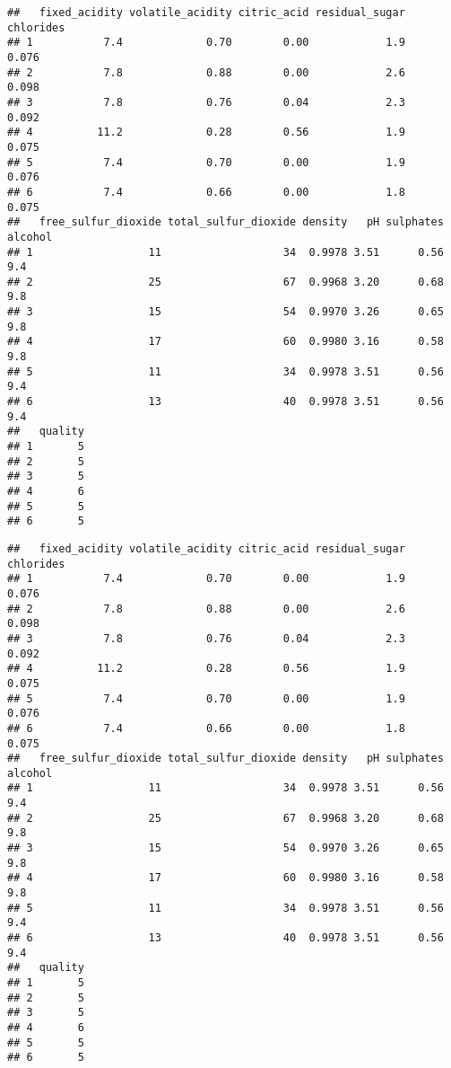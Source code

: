 \documentclass{article}
\begin{document}
\begin{verbatim}
##   fixed_acidity volatile_acidity citric_acid residual_sugar chlorides
## 1           7.4             0.70        0.00            1.9     0.076
## 2           7.8             0.88        0.00            2.6     0.098
## 3           7.8             0.76        0.04            2.3     0.092
## 4          11.2             0.28        0.56            1.9     0.075
## 5           7.4             0.70        0.00            1.9     0.076
## 6           7.4             0.66        0.00            1.8     0.075
##   free_sulfur_dioxide total_sulfur_dioxide density   pH sulphates alcohol
## 1                  11                   34  0.9978 3.51      0.56     9.4
## 2                  25                   67  0.9968 3.20      0.68     9.8
## 3                  15                   54  0.9970 3.26      0.65     9.8
## 4                  17                   60  0.9980 3.16      0.58     9.8
## 5                  11                   34  0.9978 3.51      0.56     9.4
## 6                  13                   40  0.9978 3.51      0.56     9.4
##   quality
## 1       5
## 2       5
## 3       5
## 4       6
## 5       5
## 6       5
\end{verbatim}

\begin{Shaded}
\begin{Highlighting}[]
\end{Highlighting}
\end{Shaded}

\begin{verbatim}
##   fixed_acidity volatile_acidity citric_acid residual_sugar chlorides
## 1           7.4             0.70        0.00            1.9     0.076
## 2           7.8             0.88        0.00            2.6     0.098
## 3           7.8             0.76        0.04            2.3     0.092
## 4          11.2             0.28        0.56            1.9     0.075
## 5           7.4             0.70        0.00            1.9     0.076
## 6           7.4             0.66        0.00            1.8     0.075
##   free_sulfur_dioxide total_sulfur_dioxide density   pH sulphates alcohol
## 1                  11                   34  0.9978 3.51      0.56     9.4
## 2                  25                   67  0.9968 3.20      0.68     9.8
## 3                  15                   54  0.9970 3.26      0.65     9.8
## 4                  17                   60  0.9980 3.16      0.58     9.8
## 5                  11                   34  0.9978 3.51      0.56     9.4
## 6                  13                   40  0.9978 3.51      0.56     9.4
##   quality
## 1       5
## 2       5
## 3       5
## 4       6
## 5       5
## 6       5
\end{verbatim}
\end{document}
